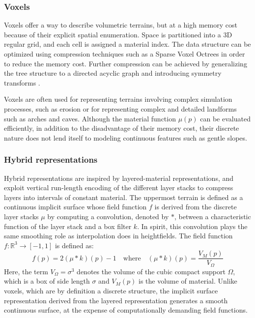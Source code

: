 \documentclass{article}
\begin{document}
\subsubsection{Voxels}

Voxels offer a way to describe volumetric terrains, but at a high memory cost because of their explicit spatial enumeration. Space is partitioned into a 3D regular grid, and each cell is assigned a material index. The data structure can be optimized using compression techniques such as a Sparse Voxel Octrees \cite{LK11} in order to reduce the memory cost. Further compression can be achieved by generalizing the tree structure to a directed acyclic graph \cite{KSA13} and introducing symmetry transforms \cite{VMG16}.

Voxels are often used for representing terrains involving complex simulation processes, such as erosion or for representing complex and detailed landforms such as arches and caves. Although the material function $\mu(p)$ can be evaluated efficiently, in addition to the disadvantage of their memory cost, their discrete nature does not lend itself to modeling continuous features such as gentle slopes.

\subsubsection{Hybrid representations}

Hybrid representations are inspired by layered-material representations, and exploit vertical run-length encoding of the different layer stacks to compress layers into intervals of constant material. The uppermost terrain is defined as a continuous implicit surface whose field function $f$ is derived from the discrete layer stacks $\mu$ by computing a convolution, denoted by $\ast$, between a characteristic function of the layer stack and a box filter $k$. In spirit, this convolution plays the same smoothing role as interpolation does in heightfields. The field function $f : \mathbb{R}^3 \to [-1,1]$ is defined as:
\[
f(p) = 2 (\mu \ast k)(p) - 1 \quad \text{where} \quad (\mu \ast k)(p) = \frac{V_M(p)}{V_\Omega}
\]
Here, the term $V_\Omega = \sigma^3$ denotes the volume of the cubic compact support $\Omega$, which is a box of side length $\sigma$ and $V_M(p)$ is the volume of material. Unlike voxels, which are by definition a discrete structure, the implicit surface representation derived from the layered representation generates a smooth continuous surface, at the expense of computationally demanding field functions.
\end{document}
